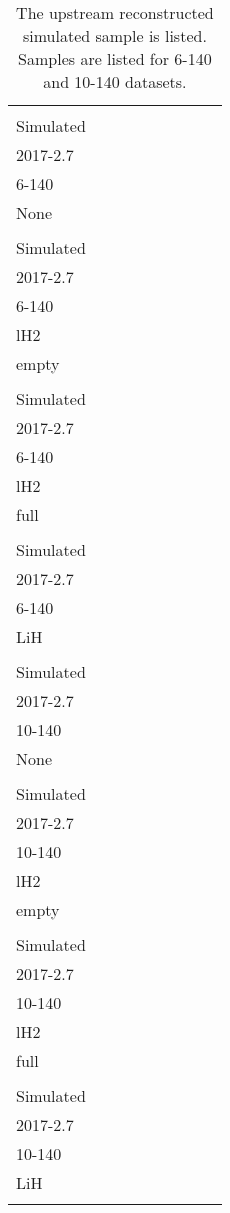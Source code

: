 \begin{landscape}
\begin{table}
\centering
\caption{The upstream reconstructed simulated sample is listed.  Samples are listed for 6-140 and 10-140 datasets.\label{tab:mc_cuts_summary_0_1}}
\begin{tabular}[pos]{l|cccccccc}
                                                   & \splitcell{\\Simulated\\2017-2.7\\6-140\\None\\} & \splitcell{\\Simulated\\2017-2.7\\6-140\\lH2\\empty\\} & \splitcell{\\Simulated\\2017-2.7\\6-140\\lH2\\full\\} & \splitcell{\\Simulated\\2017-2.7\\6-140\\LiH\\} & \splitcell{\\Simulated\\2017-2.7\\10-140\\None\\} & \splitcell{\\Simulated\\2017-2.7\\10-140\\lH2\\empty\\} & \splitcell{\\Simulated\\2017-2.7\\10-140\\lH2\\full\\} & \splitcell{\\Simulated\\2017-2.7\\10-140\\LiH\\} \\

\end{tabular}
\end{table}
\end{landscape}

